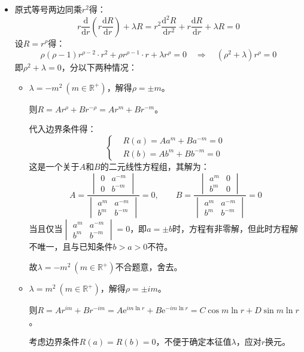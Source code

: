 \documentclass[a4paper,fontset=windows]{ctexart}
\begin{document}
\begin{itemize}
\item[2.]
原式等号两边同乘$r^2$得：
\[
r\frac{\mathrm{d}}{\mathrm{d}r}\left(r\frac{\mathrm{d}R}{\mathrm{d}r}\right) + \lambda R = r^2\frac{\mathrm{d}^2 R}{\mathrm{d}r^2} + r\frac{\mathrm{d}R}{\mathrm{d}r} + \lambda R = 0
\]
设$R = r^\rho$得：
\[
\rho(\rho-1)r^{\rho-2} \cdot r^2 + \rho r^{\rho-1} \cdot r + \lambda r^\rho = 0 \quad\Rightarrow\quad (\rho^2+\lambda)r^\rho = 0
\]
即$\rho^2+\lambda = 0$，分以下两种情况：

\begin{itemize}

\item[$\bullet$]
$\lambda = -m^2\ (m\in\mathbb{R}^+)$，解得$\rho = \pm m$。

则$R = Ar^\rho + Br^{-\rho} = Ar^m + Br^{-m}$。

代入边界条件得：
\[
\left\{
\begin{aligned}
&R(a) = Aa^m + Ba^{-m} = 0 \\
&R(b) = Ab^m + Bb^{-m} = 0
\end{aligned}
\right.
\]
这是一个关于$A$和$B$的二元线性方程组，其解为：
\[
A = \frac{\begin{vmatrix}0 & a^{-m} \\ 0 & b^{-m}\end{vmatrix}}{\begin{vmatrix}a^m & a^{-m} \\ b^m & b^{-m}\end{vmatrix}} = 0,\qquad B = \frac{\begin{vmatrix}a^m & 0 \\ b^m & 0\end{vmatrix}}{\begin{vmatrix}a^m & a^{-m} \\ b^m & b^{-m}\end{vmatrix}} = 0
\]
当且仅当$\begin{vmatrix}a^m & a^{-m} \\ b^m & b^{-m}\end{vmatrix} = 0$，即$a = \pm b$时，方程有非零解，但此时方程解不唯一，且与已知条件$b>a>0$不符。

故$\lambda = -m^2\ (m\in\mathbb{R}^+)$不合题意，舍去。

\item[$\bullet$]
$\lambda = m^2\ (m\in\mathbb{R}^+)$，解得$\rho = \pm im$。

则$R = Ar^{im} + Br^{-im} = A\mathrm{e}^{im\ln{r}} + B\mathrm{e}^{-im\ln{r}} = C\cos{m\ln r} + D\sin{m\ln r}$。

考虑边界条件$R(a) = R(b) = 0$，不便于确定本征值$\lambda$，应对$r$换元。


\end{itemize}
\end{itemize}
\end{document}
